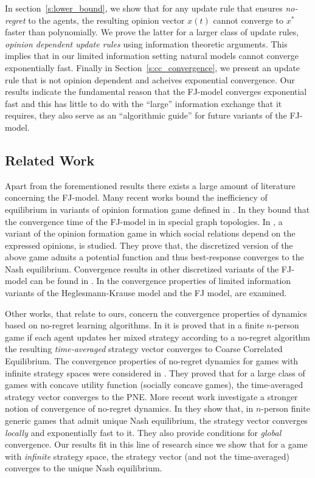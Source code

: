 In section~\ref{s:lower_bound}, we show
that for any update rule that ensures \emph{no-regret}
to the agents, the resulting opinion vector $x(t)$
cannot converge to $x^*$ faster than polynomially. We
prove the latter for a larger class of update rules,
\emph{opinion dependent update rules} using information
theoretic arguments. This implies that in our limited
information setting natural models cannot converge exponentially
fast. Finally in Section~\ref{s:cc_convergence}, we present
an update rule that is not opinion dependent and acheives exponential
convergence. Our results indicate the fundamental reason that
the FJ-model converges exponential fast and this has little
to do with the \enquote{large} information exchange that it requires,
they also serve as an \enquote{algorithmic guide} for future
variants of the FJ-model.

\subsection{Related Work}
Apart from the forementioned results there exists a large amount
of literature concerning the FJ-model.
Many recent works \cite{BGM13,CKO13,BFM16,EFHS17} bound the
inefficiency of equilibrium in variants of opinion formation game
defined in \cite{BKO11}. In \cite{GS14} they bound that the convergence
time of the FJ-model in in special graph topologies.
In \cite{BFM16}, a variant of the opinion formation game in which social
relations depend on the expressed opinions, is studied.
They prove that, the discretized version of the above game admits
a potential function and thus best-response converges to the
Nash equilibrium. Convergence results in other discretized variants of
the FJ-model can be found in \cite{YOASS13,FGV16}. In \cite{FPS16} the convergence
properties of limited information variants of the Heglesmann-Krause model \cite{HK}
and the FJ model, are examined.


Other works, that relate to ours, concern the convergence
properties of dynamics based on no-regret learning algorithms.
In \cite{FV97,FS99,SA00,SALS15} it is proved that in a finite $n$-person
game if each agent updates her mixed strategy according to a no-regret
algorithm the resulting \emph{time-averaged} strategy vector converges to
Coarse Correlated Equilibrium. The convergence properties of no-regret dynamics
for games with infinite strategy spaces were considered in \cite{EMN09}.
They proved that for a large class of games with concave utility function
(socially concave games), the time-averaged strategy vector converges to
the PNE. More recent work investigate a stronger notion of convergence of
no-regret dynamics. In \cite{CHM17} they show that,
in $n$-person finite generic games that admit unique Nash equilibrium,
the strategy vector converges \emph{locally} and exponentially fast
to it. They also provide conditions for \emph{global} convergence.
Our results fit in this line of research since we show that
for a game with \emph{infinite} strategy space, the strategy vector
(and not the time-averaged) converges to the unique Nash equilibrium.

